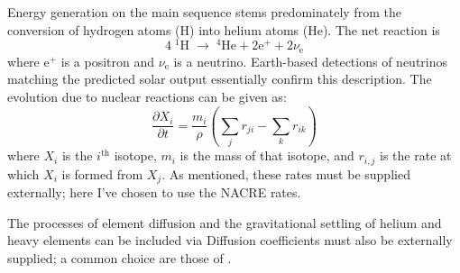 \begin{description}
    \setlength{\itemindent}{0pt}
    \item[Nuclear reactions.] Energy generation on the main sequence stems predominately from the conversion of hydrogen atoms (H) into helium atoms (He). 
    The net reaction is 
    \begin{equation}
        4\;^1\text{H}\; \rightarrow\; ^4\text{He} + 2\text{e}^+ + 2\nu_{\text{e}}
    \end{equation}
    where e$^+$ is a positron and $\nu_{\text{e}}$ is a neutrino. 
    Earth-based detections of neutrinos matching the predicted solar output essentially confirm this description. 
    The evolution due to nuclear reactions can be given as: 
    \begin{equation} \boxed{
        \frac{\partial X_i}{\partial t}
        =
        \frac{m_i}{\rho}
        \left( 
            \sum_j r_{ji}
            -
            \sum_k r_{ik}
        \right)
    }\end{equation}
    where $X_i$ is the $i^{\text{th}}$ isotope, $m_i$ is the mass of that isotope, and $r_{i,j}$ is the rate at which $X_i$ is formed from $X_j$. 
    As mentioned, these rates must be supplied externally; here I've chosen to use the \textsc{NACRE} rates. 
    
    \item[Diffusion.] The processes of element diffusion and the gravitational settling of helium and heavy elements can be included via  
    Diffusion coefficients must also be externally supplied; a common choice are those of \citealt{1994ApJ...421..828T}.
    

\end{description}

